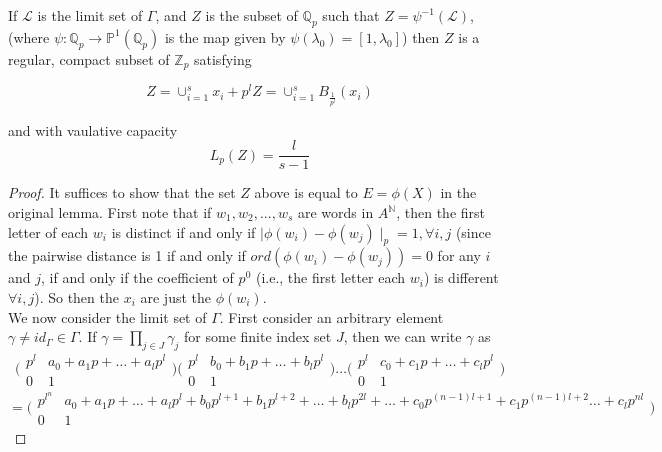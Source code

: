 If $\mathcal{L}$ is the limit set of $\Gamma$, and $Z$ is the subset of $\mathbb{Q}_p$ such that $Z = \psi^{-1}(\mathcal{L})$, (where $\psi: \mathbb{Q}_p \rightarrow \mathbb{P}^1(\mathbb{Q}_p)$ is the map given by $\psi(\lambda_0) = [1, \lambda_0]$) then $Z$ is a regular, compact subset of $\mathbb{Z}_p$ satisfying

$$ Z= \cup_{i=1}^s x_i + p^lZ =\cup_{i=1}^s B_{\frac{1}{p^l}}(x_i)$$

and with vaulative capacity \[L_p(Z) = \frac{l}{s-1}\]


\begin{proof}
	It suffices to show that the set $Z$ above is equal to $E=\phi(X)$ in the original lemma. First note that if $w_1, w_2,...,w_s$ are words in $A^\mathbb{N}$, then the first letter of each $w_i$ is distinct if and only if $\mid \phi(w_i) - \phi(w_j) \mid_p = 1, \forall i,j$  (since the pairwise distance is 1 if and only if  $ord(\phi(w_i) - \phi(w_j)) = 0$ for any $i$ and $j$, if and only if the coefficient of $p^0$ (i.e., the first letter each $w_i$) is different $\forall i,j$). So then the $x_i$ are just the $\phi(w_i)$.  \\
	
	We now consider the limit set of $\Gamma$. First consider an arbitrary element $\gamma \neq id_\Gamma \in \Gamma$. If $\gamma = \prod_{j \in J} \gamma_j$ for some finite index set $J$, then we can write $\gamma$ as \[\bigl( \begin{smallmatrix}p^l & a_0+a_1p+\ldots +a_lp^l\\ 0 & 1 \end{smallmatrix}\bigr) \bigl( \begin{smallmatrix}p^l & b_0+b_1p+\ldots +b_lp^l\\ 0 & 1 \end{smallmatrix}\bigr) \ldots \bigl( \begin{smallmatrix}p^l & c_0+c_1p+\ldots +c_lp^l\\ 0 & 1\end{smallmatrix}\bigr)\] \[=\bigl( \begin{smallmatrix}p^{l^n} & a_0+a_1p+\ldots +a_lp^l + b_0p^{l+1}+b_1p^{l+2}+\ldots +b_lp^{2l} + \ldots + c_0p^{(n-1)l +1}+c_1p^{(n-1)l+2}\ldots +c_lp^{nl}\\ 0 & 1 \end{smallmatrix}\bigr) \]
	

\end{proof}
